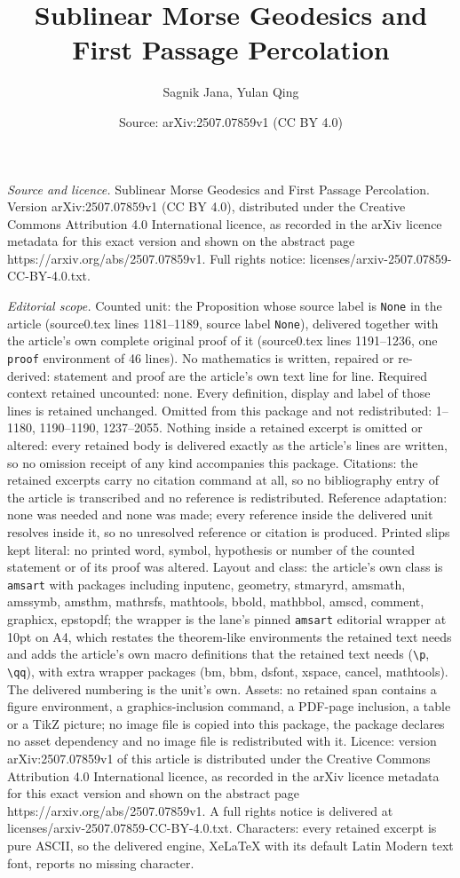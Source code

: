 \documentclass[10pt,a4paper]{amsart}
\title[Sublinear Morse Geodesics and First Passage Percolation]{Sublinear Morse Geodesics and First Passage Percolation}
\author{Sagnik Jana, Yulan Qing}
\date{Source: arXiv:2507.07859v1 (CC BY 4.0)}
\begin{document}
\maketitle

\noindent\emph{Source and licence.} Sublinear Morse Geodesics and First Passage Percolation. Version arXiv:2507.07859v1 (CC BY 4.0), distributed under the Creative Commons Attribution 4.0 International licence, as recorded in the arXiv licence metadata for this exact version and shown on the abstract page https://arxiv.org/abs/2507.07859v1. Full rights notice: licenses/arxiv-2507.07859-CC-BY-4.0.txt.\par\smallskip

\noindent\textit{Editorial scope.} Counted unit: the Proposition whose source label is \texttt{None} in the article (source0.tex lines 1181--1189, source label \texttt{None}), delivered together with the article's own complete original proof of it (source0.tex lines 1191--1236, one \texttt{proof} environment of 46 lines). No mathematics is written, repaired or re-derived: statement and proof are the article's own text line for line. Required context retained uncounted: none. Every definition, display and label of those lines is retained unchanged. Omitted from this package and not redistributed: 1--1180, 1190--1190, 1237--2055. Nothing inside a retained excerpt is omitted or altered: every retained body is delivered exactly as the article's lines are written, so no omission receipt of any kind accompanies this package. Citations: the retained excerpts carry no citation command at all, so no bibliography entry of the article is transcribed and no reference is redistributed. Reference adaptation: none was needed and none was made; every reference inside the delivered unit resolves inside it, so no unresolved reference or citation is produced. Printed slips kept literal: no printed word, symbol, hypothesis or number of the counted statement or of its proof was altered. Layout and class: the article's own class is \texttt{amsart} with packages including inputenc, geometry, stmaryrd, amsmath, amssymb, amsthm, mathrsfs, mathtools, bbold, mathbbol, amscd, comment, graphicx, epstopdf; the wrapper is the lane's pinned \texttt{amsart} editorial wrapper at 10pt on A4, which restates the theorem-like environments the retained text needs and adds the article's own macro definitions that the retained text needs (\texttt{\textbackslash p}, \texttt{\textbackslash qq}), with extra wrapper packages (bm, bbm, dsfont, xspace, cancel, mathtools). The delivered numbering is the unit's own. Assets: no retained span contains a figure environment, a graphics-inclusion command, a PDF-page inclusion, a table or a TikZ picture; no image file is copied into this package, the package declares no asset dependency and no image file is redistributed with it. Licence: version arXiv:2507.07859v1 of this article is distributed under the Creative Commons Attribution 4.0 International licence, as recorded in the arXiv licence metadata for this exact version and shown on the abstract page https://arxiv.org/abs/2507.07859v1. A full rights notice is delivered at licenses/arxiv-2507.07859-CC-BY-4.0.txt. Characters: every retained excerpt is pure ASCII, so the delivered engine, XeLaTeX with its default Latin Modern text font, reports no missing character.
\end{document}
